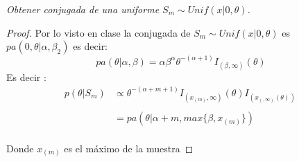 \documentclass[11pt,letterpaper]{article}
\begin{document}
\begin{tcolorbox}[
    title = \textcolor{white}{\textbf{Problema 3}},
    colbacktitle=AzulUNAM!95!black,         %
    coltitle=white,                         %
    colback=OroUNAM!7!white,                %
    colframe=OroUNAM!90!black,              %
    fontupper=\small]
\textit{Obtener conjugada de una uniforme $S_m\sim Unif(x|0,\theta )$.
}
\end{tcolorbox}
\begin{proof}
    Por lo visto en clase la conjugada de $S_m\sim Unif(x|0,\theta)$ es $pa(0,\theta|\alpha,\beta_2)$ es decir:\,\\
    \begin{equation*}
        pa(\theta|\alpha,\beta)=\alpha\beta^{\alpha}\theta^{-(\alpha+1)}I_{(\beta,\infty)}(\theta)
    \end{equation*}
    Es decir :\,\\
    \begin{align*}
        p(\theta|S_m)&\varpropto \theta^{-(\alpha+m+1)}I_{(x_{(m)},\infty)}(\theta)I_{(x_{(,\infty)}(\theta))}\,\\
        \,\\
        &=pa(\theta|\alpha+m,max\{\beta,x_{(m)}\})
    \end{align*}\,\\
    Donde $x_{(m)}$ es el m\'aximo de la muestra
\end{proof}
\end{document}

